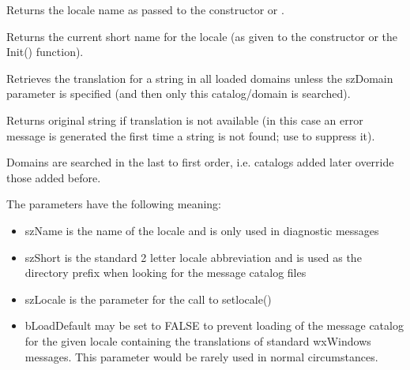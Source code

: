 \label{wxlocalegetlocale}


Returns the locale name as passed to the constructor or 
.

\label{wxlocalegetname}


Returns the current short name for the locale (as given to the constructor or
the Init() function).

\label{wxlocalegetstring}


Retrieves the translation for a string in all loaded domains unless the szDomain
parameter is specified (and then only this catalog/domain is searched).

Returns original string if translation is not available
(in this case an error message is generated the first time
a string is not found; use  to suppress it).


Domains are searched in the last to first order, i.e. catalogs
added later override those added before.

\label{wxlocaleinit}


The parameters have the following meaning:

\begin{itemize}\itemsep=0pt
\item szName is the name of the locale and is only used in diagnostic messages
\item szShort is the standard 2 letter locale abbreviation and is used as the
directory prefix when looking for the message catalog files
\item szLocale is the parameter for the call to setlocale()
\item bLoadDefault may be set to FALSE to prevent loading of the message catalog
for the given locale containing the translations of standard wxWindows messages.
This parameter would be rarely used in normal circumstances.
\end{itemize}

